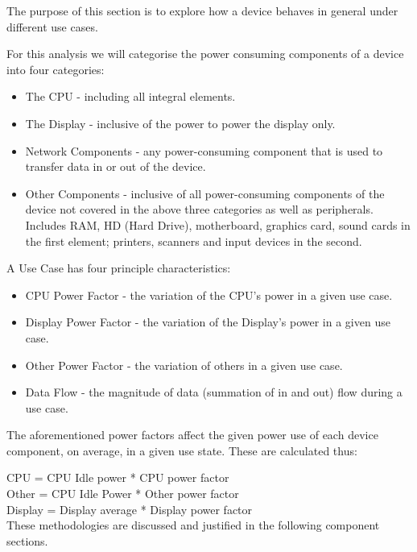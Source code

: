 \documentclass[conference]{IEEEtran}
\begin{document}
The purpose of this section is to explore how a device behaves in general under different use cases.


For this analysis we will categorise the power consuming components of
a device into four categories:

\begin{itemize}
\item The CPU - including all integral elements.
\item The Display - inclusive of the power to power the display only.
\item Network Components - any power-consuming component that is used to transfer data in or out of the device.
\item Other Components - inclusive of all power-consuming components
  of the device not covered in the above three categories as well as
  peripherals. Includes RAM, HD (Hard Drive), motherboard, graphics
  card, sound cards in the first element; printers, scanners and input
  devices in the second.
\end{itemize}


A Use Case has four principle characteristics:

\begin{itemize}
\item CPU Power Factor - the variation of the CPU’s power in a given use case.
\item Display Power Factor - the variation of the Display’s power in a given use case.
\item Other Power Factor - the variation of others in a given use case.
\item Data Flow - the magnitude of data (summation of in and out) flow during a use case.
\end{itemize}


The aforementioned power factors affect the given power use of each
device component, on average, in a given use state. These are
calculated thus:

CPU = CPU Idle power * CPU power factor\\
Other = CPU Idle Power * Other power factor\\
Display = Display average * Display power factor\\

These methodologies are discussed and justified in the following
component sections.
\end{document}
